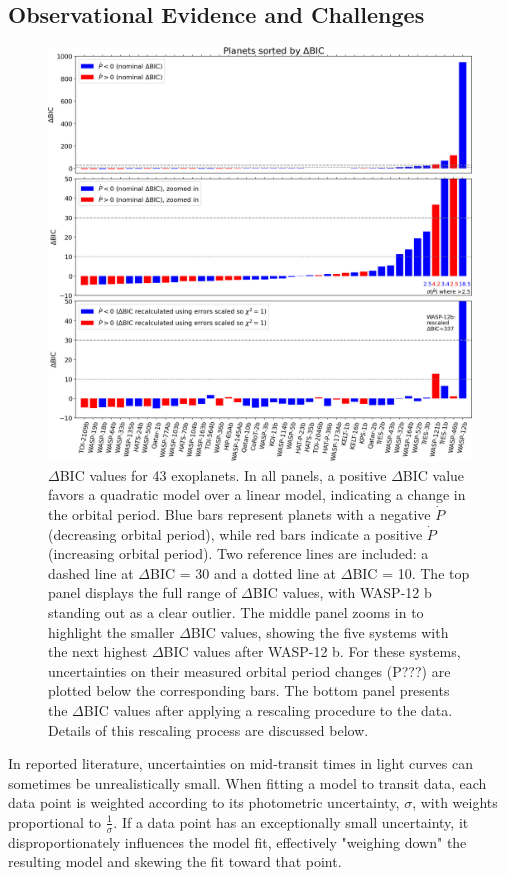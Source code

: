 \documentclass[oneside,12pt]{amsart}
\numberwithin{page}{section}
\begin{document}
\subsection{Observational Evidence and Challenges}

\begin{figure}[htbp]
    \centering
    \includegraphics[width=0.9\linewidth]{figs/adams_fig2.jpg}
    \caption{$\Delta$BIC values for 43 exoplanets. In all panels, a positive $\Delta$BIC value favors a quadratic model over a linear model, indicating a change in the orbital period. Blue bars represent planets with a negative $\dot{P}$ (decreasing orbital period), while red bars indicate a positive $\dot{P}$ (increasing orbital period). Two reference lines are included: a dashed line at $\Delta$BIC = 30 and a dotted line at $\Delta$BIC = 10. 
    The top panel displays the full range of $\Delta$BIC values, with WASP-12 b standing out as a clear outlier. The middle panel zooms in to highlight the smaller $\Delta$BIC values, showing the five systems with the next highest $\Delta$BIC values after WASP-12 b. For these systems, uncertainties on their measured orbital period changes (P???) are plotted below the corresponding bars. The bottom panel presents the $\Delta$BIC values after applying a rescaling procedure to the data. Details of this rescaling process are discussed below.}
    \label{fig:adams-fig2}
\end{figure}

In reported literature, uncertainties on mid-transit times in light curves can sometimes be unrealistically small. When fitting a model to transit data, each data point is weighted according to its photometric uncertainty, $\sigma$, with weights proportional to $\frac{1}{\sigma}$. If a data point has an exceptionally small uncertainty, it disproportionately influences the model fit, effectively "weighing down" the resulting model and skewing the fit toward that point.
\end{document}

